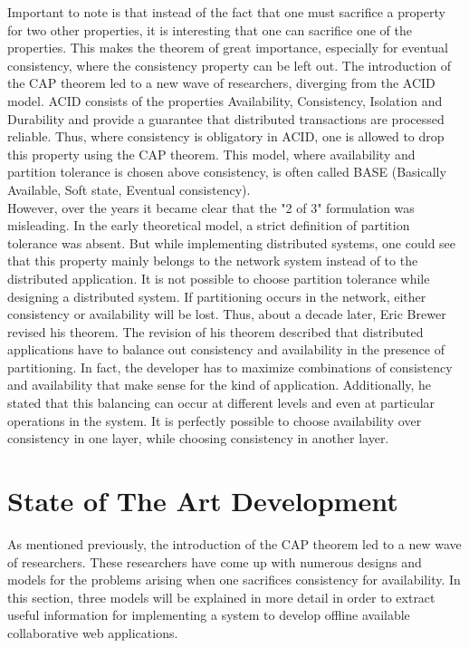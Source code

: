 \documentclass[a4paper,12pt]{report}
\begin{document}
Important to note is that instead of the fact that one must sacrifice a property for two other properties, it is interesting that one can sacrifice one of the properties. This makes the theorem of great importance, especially for eventual consistency, where the consistency property can be left out. The introduction of the CAP theorem led to a new wave of researchers, diverging from the ACID model. ACID consists of the properties Availability, Consistency, Isolation and Durability and provide a guarantee that distributed transactions are processed reliable. Thus, where consistency is obligatory in ACID, one is allowed to drop this property using the CAP theorem. This model, where availability and partition tolerance is chosen above consistency, is often called BASE (Basically Available, Soft state, Eventual consistency). \\
However, over the years it became clear that the "2 of 3" formulation was misleading. In the early theoretical model, a strict definition of partition tolerance was absent. But while implementing distributed systems, one could see that this property mainly belongs to the network system instead of to the distributed application. It is not possible to choose partition tolerance while designing a distributed system. If partitioning occurs in the network, either consistency or availability will be lost. Thus, about a decade later, Eric Brewer revised his theorem. The revision of his theorem described that distributed applications have to balance out consistency and availability in the presence of partitioning. In fact, the developer has to maximize combinations of consistency and availability that make sense for the kind of application. Additionally, he stated that this balancing can occur at different levels and even at particular operations in the system. It is perfectly possible to choose availability over consistency in one layer, while choosing consistency in another layer.

\section{State of The Art Development}\label{sec:StateOfTheArt}

As mentioned previously, the introduction of the CAP theorem led to a new wave of researchers. These researchers have come up with numerous designs and models for the problems arising when one sacrifices consistency for availability. In this section, three models will be explained in more detail in order to extract useful information for implementing a system to develop offline available collaborative web applications.
\end{document}
